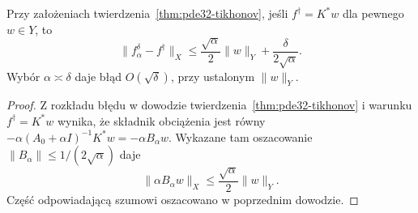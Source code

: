 \begin{stwierdzenie}
\label{prop:pde32-source}
Przy założeniach twierdzenia~\ref{thm:pde32-tikhonov}, jeśli
$f^\dagger=K^*w$ dla pewnego $w\in Y$, to
\begin{equation}\label{eq:pde32-rate}
 \|f_\alpha^\delta-f^\dagger\|_X
 \le \frac{\sqrt\alpha}{2}\|w\|_Y
 +\frac\delta{2\sqrt\alpha}.
\end{equation}
Wybór $\alpha\asymp\delta$ daje błąd $O(\sqrt\delta)$,
przy ustalonym $\|w\|_Y$.
\end{stwierdzenie}
\begin{proof}
Z rozkładu błędu w dowodzie twierdzenia~\ref{thm:pde32-tikhonov} i warunku $f^\dagger=K^*w$
wynika, że składnik obciążenia jest równy
$-\alpha(A_0+\alpha I)^{-1}K^*w=-\alpha B_\alpha w$.
Wykazane tam oszacowanie $\|B_\alpha\|\le1/(2\sqrt\alpha)$
daje
\[
 \|\alpha B_\alpha w\|_X
 \le\frac{\sqrt\alpha}{2}\|w\|_Y .
\]
Część odpowiadającą szumowi oszacowano w poprzednim dowodzie.
\end{proof}


